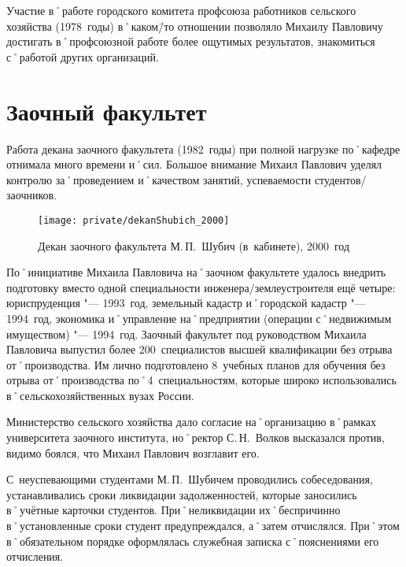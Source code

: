 Участие в˚работе городского комитета профсоюза работников сельского хозяйства (1978~годы) в˚каком\=/то отношении позволяло Михаилу Павловичу достигать в˚профсоюзной работе более ощутимых результатов, знакомиться с˚работой других организаций.






\section*{Заочный факультет}
\label{sec:correspondenceFaculty}

Работа декана заочного факультета (1982~годы) при полной нагрузке по˚кафедре отнимала много времени и˚сил. Большое внимание Михаил Павлович уделял контролю за˚проведением и˚качеством занятий, успеваемости студентов\-/заочников.

\begin{figure}[h]
\texttt{[image: private/dekanShubich\_2000]}
\caption[Декан заочного факультета М.\,П.~Шубич (в~кабинете), 2000~год]{Декан заочного факультета М.\,П.~Шубич (в~кабинете), 2000~год\footnotemark}
\label{fig:dekanShubich_2000}
\end{figure}

По˚инициативе Михаила Павловича на˚заочном факультете удалось внедрить подготовку вместо одной специальности инженера\-/землеустроителя ещё четыре: юриспруденция "--- 1993~год, земельный кадастр и˚городской кадастр "--- 1994~год, экономика и˚управление на˚предприятии (операции с˚недвижимым имуществом) "--- 1994~год. Заочный факультет под руководством Михаила Павловича выпустил более 200~специалистов высшей квалификации без отрыва от˚производства. Им лично подготовлено 8~учебных планов для обучения без отрыва от˚производства по˚4~специальностям, которые широко использовались в˚сельскохозяйственных вузах России. 

Министерство сельского хозяйства дало согласие на˚организацию в˚рамках университета заочного института, но˚ректор С.\,Н.~Волков высказался против, видимо боялся, что Михаил Павлович возглавит его.

С~неуспевающими студентами М.\,П.~Шубичем проводились собеседования, устанавливались сроки ликвидации задолженностей, которые заносились в˚учётные карточки студентов. При˚неликвидации их˚беспричинно в˚установленные сроки студент предупреждался, а˚затем отчислялся. При˚этом в˚обязательном порядке оформлялась служебная записка с˚пояснениями его отчисления.

